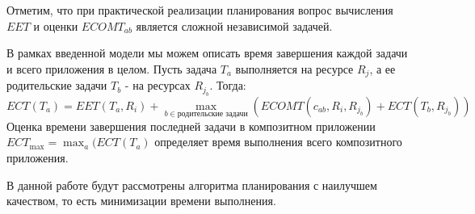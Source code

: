\begin{spacing}{1.4}
Отметим, что при практической реализации планирования вопрос вычисления $EET$ и оценки $ECOMT_{ab}$ является сложной независимой задачей.



В рамках введенной модели мы можем описать время завершения каждой задачи и всего приложения в целом. Пусть задача $T_a$ выполняется на ресурсе $R_j$, а ее родительские задачи $T_b$ - на ресурсах $R_{j_b}$. Тогда:
$$
ECT(T_a) = EET(T_a, R_i) + \max_{b \in \text{родительские задачи}} (ECOMT(c_{ab}, R_i, R_{j_b}) + ECT (T_b, R_{j_b})) 
$$
Оценка времени завершения последней задачи в композитном приложении $ECT_{\max} = \max_a (ECT(T_a)$ определяет время выполнения всего композитного приложения. 

В данной работе будут рассмотрены алгоритма планирования с наилучшем качеством, то есть минимизации времени выполнения.




\end{spacing}